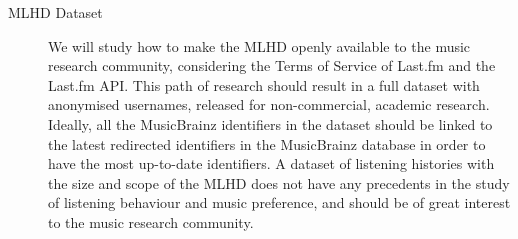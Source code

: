 \begin{description}
\item [MLHD Dataset] 
We will study how to make the MLHD openly available to the music research community, considering the Terms of Service of Last.fm and the Last.fm API. 
This path of research should result in a full dataset with anonymised usernames, released for non-commercial, academic research. 
Ideally, all the MusicBrainz identifiers in the dataset should be linked to the latest redirected identifiers in the MusicBrainz database in order to have the most up-to-date identifiers.
A dataset of listening histories with the size and scope of the MLHD does not have any precedents in the study of listening behaviour and music preference, and should be of great interest to the music research community.



\end{description}


